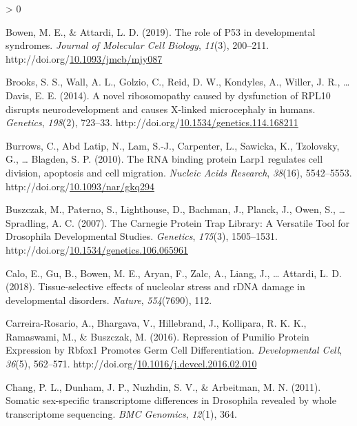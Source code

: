 \documentclass[12pt,oneside]{reedthesis}
\newlength{\cslhangindent}
\newenvironment{CSLReferences}[2] %
 {%
  \setlength{\parindent}{0pt}
  \ifodd #1 \everypar{\setlength{\hangindent}{\cslhangindent}}\ignorespaces\fi
  \ifnum #2 > 0
  \setlength{\parskip}{#2\baselineskip}
  \fi
 }%
 {}
\begin{document}
\begin{CSLReferences}{1}{0}
\leavevmode\hypertarget{ref-bowenRoleP53Developmental2019}{}%
Bowen, M. E., \& Attardi, L. D. (2019). The role of P53 in developmental syndromes. \emph{Journal of Molecular Cell Biology}, \emph{11}(3), 200--211. http://doi.org/\href{https://doi.org/10.1093/jmcb/mjy087}{10.1093/jmcb/mjy087}

\leavevmode\hypertarget{ref-Brooks2014b}{}%
Brooks, S. S., Wall, A. L., Golzio, C., Reid, D. W., Kondyles, A., Willer, J. R., \ldots{} Davis, E. E. (2014). A novel ribosomopathy caused by dysfunction of {RPL10} disrupts neurodevelopment and causes {X}-linked microcephaly in humans. \emph{Genetics}, \emph{198}(2), 723--33. http://doi.org/\href{https://doi.org/10.1534/genetics.114.168211}{10.1534/genetics.114.168211}

\leavevmode\hypertarget{ref-burrowsRNABindingProtein2010}{}%
Burrows, C., Abd Latip, N., Lam, S.-J., Carpenter, L., Sawicka, K., Tzolovsky, G., \ldots{} Blagden, S. P. (2010). The {RNA} binding protein {Larp1} regulates cell division, apoptosis and cell migration. \emph{Nucleic Acids Research}, \emph{38}(16), 5542--5553. http://doi.org/\href{https://doi.org/10.1093/nar/gkq294}{10.1093/nar/gkq294}

\leavevmode\hypertarget{ref-buszczakCarnegieProteinTrap2007}{}%
Buszczak, M., Paterno, S., Lighthouse, D., Bachman, J., Planck, J., Owen, S., \ldots{} Spradling, A. C. (2007). The {Carnegie Protein Trap Library}: {A Versatile Tool} for {Drosophila Developmental Studies}. \emph{Genetics}, \emph{175}(3), 1505--1531. http://doi.org/\href{https://doi.org/10.1534/genetics.106.065961}{10.1534/genetics.106.065961}

\leavevmode\hypertarget{ref-Calo2018a}{}%
Calo, E., Gu, B., Bowen, M. E., Aryan, F., Zalc, A., Liang, J., \ldots{} Attardi, L. D. (2018). Tissue-selective effects of nucleolar stress and {rDNA} damage in developmental disorders. \emph{Nature}, \emph{554}(7690), 112.

\leavevmode\hypertarget{ref-Carreira-Rosario2016e}{}%
Carreira-Rosario, A., Bhargava, V., Hillebrand, J., Kollipara, R. K. K., Ramaswami, M., \& Buszczak, M. (2016). Repression of {Pumilio Protein Expression} by {Rbfox1 Promotes Germ Cell Differentiation}. \emph{Developmental Cell}, \emph{36}(5), 562--571. http://doi.org/\href{https://doi.org/10.1016/j.devcel.2016.02.010}{10.1016/j.devcel.2016.02.010}

\leavevmode\hypertarget{ref-Chang2011}{}%
Chang, P. L., Dunham, J. P., Nuzhdin, S. V., \& Arbeitman, M. N. (2011). Somatic sex-specific transcriptome differences in {Drosophila} revealed by whole transcriptome sequencing. \emph{BMC Genomics}, \emph{12}(1), 364.


\end{CSLReferences}
\end{document}

